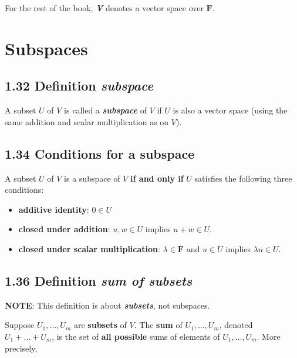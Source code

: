 \documentclass[12pt, letterpaper, oneside]{book}
\begin{document}
For the rest of the book, \textbf{\textit{V}} denotes a vector space over
$\mathbf{F}$.

\section{Subspaces}

\subsection{1.32 Definition \textit{subspace}}

A subset $U$ of $V$ is called a \textbf{\textit{subspace}} of $V$ if $U$ is
also a vector space (using the same addition and scalar multiplication as on
$V$).

\subsection{1.34 Conditions for a subspace}

A subset $U$ of $V$ is a subspace of $V$ \textbf{if and only if} $U$ satisfies
the following three conditions:

\begin{itemize}
  \item \textbf{additive identity}: $0 \in U$
  \item \textbf{closed under addition}: $u, w \in U$ implies $u + w \in U$.
  \item \textbf{closed under scalar multiplication}: $\lambda \in \mathbf{F}$
    and $u \in U$ implies $\lambda u \in U$.
\end{itemize}

\subsection{1.36 Definition \textbf{\textit{sum of subsets}}}

\textbf{NOTE}: This definition is about \textbf{\textit{subsets}}, not
subspaces.

Suppose $U_1, \ldots, U_m$ are \textbf{subsets} of $V$. The \textbf{sum} of
$U_1, \ldots, U_m$, denoted $U_1 + \ldots + U_m$, is the set of \textbf{all
possible} sums of elements of $U_1, \ldots, U_m$. More precisely,
\end{document}
